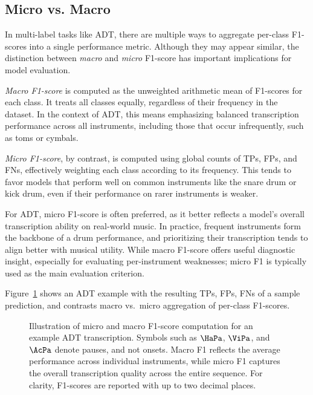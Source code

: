 \subsection{Micro vs. Macro}

In multi-label tasks like \gls{ADT}, there are multiple ways to aggregate per-class F1-scores into a single performance metric. Although they may appear similar, the distinction between \textit{macro} and \textit{micro} F1-score has important implications for model evaluation.

\textit{Macro F1-score} is computed as the unweighted arithmetic mean of F1-scores for each class. It treats all classes equally, regardless of their frequency in the dataset. In the context of \gls{ADT}, this means emphasizing balanced transcription performance across all instruments, including those that occur infrequently, such as toms or cymbals.

\textit{Micro F1-score}, by contrast, is computed using global counts of \glspl{TP}, \glspl{FP}, and \glspl{FN}, effectively weighting each class according to its frequency. This tends to favor models that perform well on common instruments like the snare drum or kick drum, even if their performance on rarer instruments is weaker.

For \gls{ADT}, micro F1-score is often preferred, as it better reflects a model's overall transcription ability on real-world music. In practice, frequent instruments form the backbone of a drum performance, and prioritizing their transcription tends to align better with musical utility. While macro F1-score offers useful diagnostic insight, especially for evaluating per-instrument weaknesses; micro F1 is typically used as the main evaluation criterion.

Figure~\ref{F1Figure} shows an \gls{ADT} example with the resulting \glspl{TP}, \glspl{FP}, \glspl{FN} of a sample prediction, and contrasts macro vs.\ micro aggregation of per-class F1-scores.

\begin{figure}[H]
    \centering
    \hspace*{-0.5cm}
    
    \caption{Illustration of micro and macro F1-score computation for an example \gls{ADT} transcription. Symbols such as $\HaPa$, $\ViPa$, and $\AcPa$ denote pauses, and not onsets. Macro F1 reflects the average performance across individual instruments, while micro F1 captures the overall transcription quality across the entire sequence. For clarity, F1-scores are reported with up to two decimal places.}
    \label{F1Figure}
\end{figure}